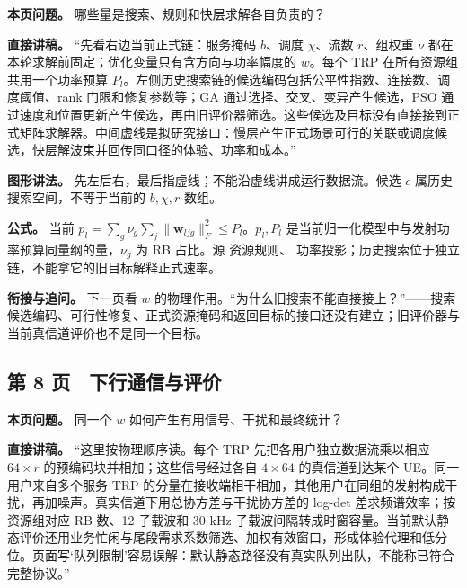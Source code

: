 \documentclass[11pt,a4paper]{ctexart}
\begin{document}
\textbf{本页问题。} 哪些量是搜索、规则和快层求解各自负责的？\par

\textbf{直接讲稿。} “先看右边当前正式链：服务掩码 $b$、调度 $\chi$、流数 $r$、组权重 $\nu$ 都在本轮求解前固定；优化变量只有含方向与功率幅度的 $w$。每个 TRP 在所有资源组共用一个功率预算 $P_l$。左侧历史搜索链的候选编码包括公平性指数、连接数、调度阈值、rank 门限和修复参数等；GA 通过选择、交叉、变异产生候选，PSO 通过速度和位置更新产生候选，再由旧评价器筛选。这些候选及目标没有直接接到正式矩阵求解器。中间虚线是拟研究接口：慢层产生正式场景可行的关联或调度候选，快层解波束并回传同口径的体验、功率和成本。”\par

\textbf{图形讲法。} 先左后右，最后指虚线；不能沿虚线讲成运行数据流。候选 $c$ 属历史搜索空间，不等于当前的 $b,\chi,r$ 数组。\par

\textbf{公式。} 当前 $p_l=\sum_g\nu_g\sum_j\|\mathbf w_{ljg}\|_F^2\le P_l$。$p_l,P_l$ 是当前归一化模型中与发射功率预算同量纲的量，$\nu_g$ 为 RB 占比。源  资源规则、 功率投影；历史搜索位于独立  链，不能拿它的旧目标解释正式速率。\par

\textbf{衔接与追问。} 下一页看 $w$ 的物理作用。“为什么旧搜索不能直接接上？”——搜索候选编码、可行性修复、正式资源掩码和返回目标的接口还没有建立；旧评价器与当前真信道评价也不是同一个目标。\par

\subsection*{第 8 页　下行通信与评价}

\textbf{本页问题。} 同一个 $w$ 如何产生有用信号、干扰和最终统计？\par

\textbf{直接讲稿。} “这里按物理顺序读。每个 TRP 先把各用户独立数据流乘以相应 $64\times r$ 的预编码块并相加；这些信号经过各自 $4\times64$ 的真信道到达某个 UE。同一用户来自多个服务 TRP 的分量在接收端相干相加，其他用户在同组的发射构成干扰，再加噪声。真实信道下用总协方差与干扰协方差的 log-det 差求频谱效率；按资源组对应 RB 数、12 子载波和 30 kHz 子载波间隔转成时窗容量。当前默认静态评价还用业务忙闲与尾段需求系数筛选、加权有效窗口，形成体验代理和低分位。页面写‘队列限制’容易误解：默认静态路径没有真实队列出队，不能称已符合完整协议。”\par
\end{document}
